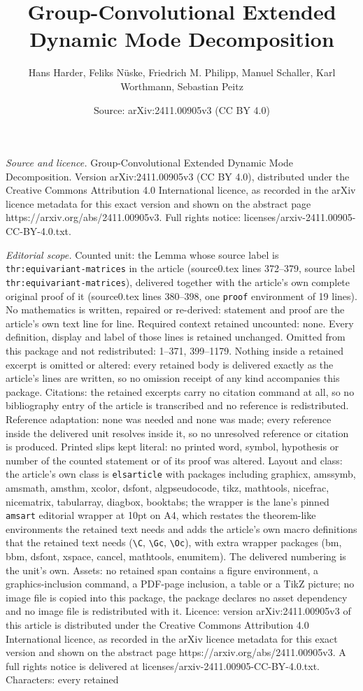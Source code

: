 \documentclass[10pt,a4paper]{amsart}
\title[Group-Convolutional Extended Dynamic Mode Decomposition]{Group-Convolutional Extended Dynamic Mode Decomposition}
\author{Hans Harder, Feliks N\"uske, Friedrich M. Philipp, Manuel Schaller, Karl Worthmann, Sebastian Peitz}
\date{Source: arXiv:2411.00905v3 (CC BY 4.0)}
\begin{document}
\maketitle

\noindent\emph{Source and licence.} Group-Convolutional Extended Dynamic Mode Decomposition. Version arXiv:2411.00905v3 (CC BY 4.0), distributed under the Creative Commons Attribution 4.0 International licence, as recorded in the arXiv licence metadata for this exact version and shown on the abstract page https://arxiv.org/abs/2411.00905v3. Full rights notice: licenses/arxiv-2411.00905-CC-BY-4.0.txt.\par\smallskip

\noindent\textit{Editorial scope.} Counted unit: the Lemma whose source label is \texttt{thr:equivariant-matrices} in the article (source0.tex lines 372--379, source label \texttt{thr:equivariant-matrices}), delivered together with the article's own complete original proof of it (source0.tex lines 380--398, one \texttt{proof} environment of 19 lines). No mathematics is written, repaired or re-derived: statement and proof are the article's own text line for line. Required context retained uncounted: none. Every definition, display and label of those lines is retained unchanged. Omitted from this package and not redistributed: 1--371, 399--1179. Nothing inside a retained excerpt is omitted or altered: every retained body is delivered exactly as the article's lines are written, so no omission receipt of any kind accompanies this package. Citations: the retained excerpts carry no citation command at all, so no bibliography entry of the article is transcribed and no reference is redistributed. Reference adaptation: none was needed and none was made; every reference inside the delivered unit resolves inside it, so no unresolved reference or citation is produced. Printed slips kept literal: no printed word, symbol, hypothesis or number of the counted statement or of its proof was altered. Layout and class: the article's own class is \texttt{elsarticle} with packages including graphicx, amssymb, amsmath, amsthm, xcolor, dsfont, algpseudocode, tikz, mathtools, nicefrac, nicematrix, tabularray, diagbox, booktabs; the wrapper is the lane's pinned \texttt{amsart} editorial wrapper at 10pt on A4, which restates the theorem-like environments the retained text needs and adds the article's own macro definitions that the retained text needs (\texttt{\textbackslash C}, \texttt{\textbackslash Gc}, \texttt{\textbackslash Oc}), with extra wrapper packages (bm, bbm, dsfont, xspace, cancel, mathtools, enumitem). The delivered numbering is the unit's own. Assets: no retained span contains a figure environment, a graphics-inclusion command, a PDF-page inclusion, a table or a TikZ picture; no image file is copied into this package, the package declares no asset dependency and no image file is redistributed with it. Licence: version arXiv:2411.00905v3 of this article is distributed under the Creative Commons Attribution 4.0 International licence, as recorded in the arXiv licence metadata for this exact version and shown on the abstract page https://arxiv.org/abs/2411.00905v3. A full rights notice is delivered at licenses/arxiv-2411.00905-CC-BY-4.0.txt. Characters: every retained 
\end{document}
